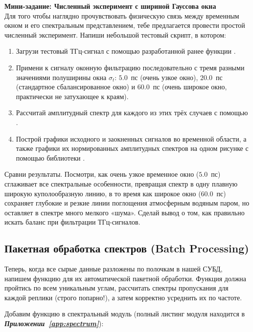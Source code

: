 \begin{minitaskbox}
	\textbf{Мини-задание: Численный эксперимент с шириной Гауссова окна} \\
	Для того чтобы наглядно прочувствовать физическую связь между временным окном и его спектральным представлением, тебе предлагается провести простой численный эксперимент. Напиши небольшой тестовый скрипт, в котором:
	\begin{enumerate}
		\item Загрузи тестовый ТГц-сигнал с помощью разработанной ранее функции .
		\item Примени к сигналу оконную фильтрацию  последовательно с тремя разными значениями полуширины окна $\sigma_t$: $5.0$~пс (очень узкое окно), $20.0$~пс (стандартное сбалансированное окно) и $60.0$~пс (очень широкое окно, практически не затухающее к краям).
		\item Рассчитай амплитудный спектр для каждого из этих трёх случаев с помощью .
		\item Построй графики исходного и заокненных сигналов во временной области, а также графики их нормированных амплитудных спектров на одном рисунке с помощью библиотеки .
	\end{enumerate}
	Сравни результаты. Посмотри, как очень узкое временное окно ($5.0$~пс) сглаживает все спектральные особенности, превращая спектр в одну плавную широкую куполообразную линию, в то время как широкое окно ($60.0$~пс) сохраняет глубокие и резкие линии поглощения атмосферным водяным паром, но оставляет в спектре много мелкого «шума». Сделай вывод о том, как правильно искать баланс при фильтрации ТГц-сигналов.
\end{minitaskbox}

\subsection{Пакетная обработка спектров (Batch Processing)}\label{ssec:process_dataset}

Теперь, когда все сырые данные разложены по полочкам в нашей СУБД, напишем функцию для их автоматической пакетной обработки. Функция должна пройтись по всем уникальным углам, рассчитать спектры пропускания для каждой реплики (строго попарно!), а затем корректно усреднить их по частоте.

Добавим функцию  в спектральный модуль  (полный листинг модуля находится в \textbf{\textit{Приложении~\ref{app:spectrum}}}):


